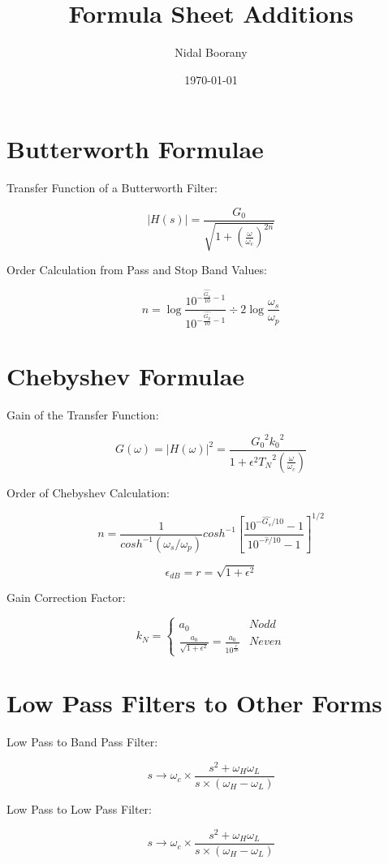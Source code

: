 \documentclass{article}
\begin{document}
\title{Formula Sheet Additions}
\author{Nidal Boorany}
\date{\today}
\maketitle

\section{Butterworth Formulae}
Transfer Function of a Butterworth Filter:

$$|H(s)| = \frac{G_0}{\sqrt{1 + (\frac{\omega}{\omega_c})^{2n}}}$$

Order Calculation from Pass and Stop Band Values:

$$n = \log{\frac{10^{- \frac{\hat{G_s}}{10} - 1}}{10^{- \frac{\hat{G_p}}{ 10} - 1}}} \div {2 \log{\frac{\omega_s}{\omega_p}}}$$

\section{Chebyshev Formulae}

Gain of the Transfer Function:

$$G(\omega) = |H(\omega)|^2 = \frac{{G_0}^2 {k_0}^2}{1 + {\epsilon}^2 {T_N}^2(\frac{\omega}{\omega_c})}$$

Order of Chebyshev Calculation:

$$n = \frac{1}{cosh^{-1}(\omega_{s}/\omega_{p})}cosh^{-1}\left[\frac{10^{-\hat{G_{s}}/10}-1}{10^{-\hat{r}/10}-1}\right]^{1/2}$$

$$\epsilon_{dB} = r = \sqrt{1 + \epsilon^{2}}$$

Gain Correction Factor:

$$k_N = \begin{cases} 
    a_0 & N odd\\ 
    \frac{a_0}{\sqrt{1+ \epsilon^2}} = \frac{a_0}{10^{\frac{\hat{r}}{20}}} & N even
\end{cases}
$$

\section{Low Pass Filters to Other Forms}

Low Pass to Band Pass Filter:

$$s \rightarrow \omega_c \times \frac{s^2 + \omega_H \omega_L}{s\times (\omega_H - \omega_L)}$$

Low Pass to Low Pass Filter:

$$s \rightarrow \omega_c \times \frac{s^2+\omega_H \omega_L}{s \times(\omega_H - \omega_L)}$$
\end{document}
